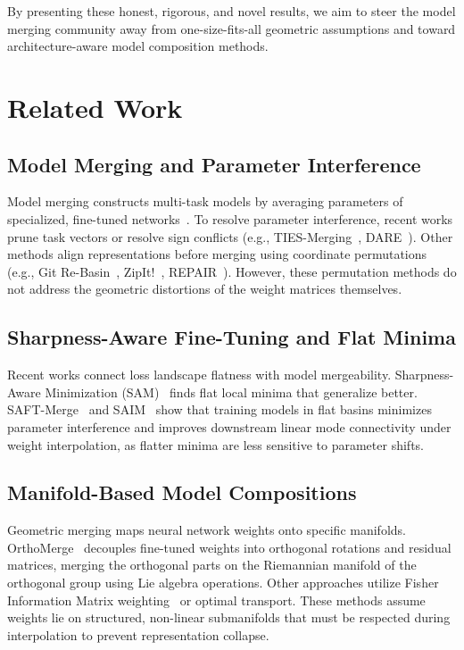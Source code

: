 \documentclass{article}
\begin{document}
By presenting these honest, rigorous, and novel results, we aim to steer the model merging community away from one-size-fits-all geometric assumptions and toward architecture-aware model composition methods.

\section{Related Work}
\label{sec:related}

\subsection{Model Merging and Parameter Interference}
Model merging constructs multi-task models by averaging parameters of specialized, fine-tuned networks~\cite{wortsman2022model,ilharco2022editing}. 
To resolve parameter interference, recent works prune task vectors or resolve sign conflicts (e.g., TIES-Merging~\cite{yadav2023ties}, DARE~\cite{yu2024dare}). 
Other methods align representations before merging using coordinate permutations (e.g., Git Re-Basin~\cite{ainsworth2022git}, ZipIt!~\cite{stoica2023zipit}, REPAIR~\cite{jordan2022repair}). However, these permutation methods do not address the geometric distortions of the weight matrices themselves.

\subsection{Sharpness-Aware Fine-Tuning and Flat Minima}
Recent works connect loss landscape flatness with model mergeability. 
Sharpness-Aware Minimization (SAM)~\cite{foret2021sharpness} finds flat local minima that generalize better. 
SAFT-Merge~\cite{lee2025mitigating} and SAIM~\cite{anonymous2026saim} show that training models in flat basins minimizes parameter interference and improves downstream linear mode connectivity under weight interpolation, as flatter minima are less sensitive to parameter shifts.

\subsection{Manifold-Based Model Compositions}
Geometric merging maps neural network weights onto specific manifolds. 
OrthoMerge~\cite{yang2026orthomerge} decouples fine-tuned weights into orthogonal rotations and residual matrices, merging the orthogonal parts on the Riemannian manifold of the orthogonal group using Lie algebra operations. Other approaches utilize Fisher Information Matrix weighting~\cite{matena2022merging} or optimal transport. These methods assume weights lie on structured, non-linear submanifolds that must be respected during interpolation to prevent representation collapse.
\end{document}
